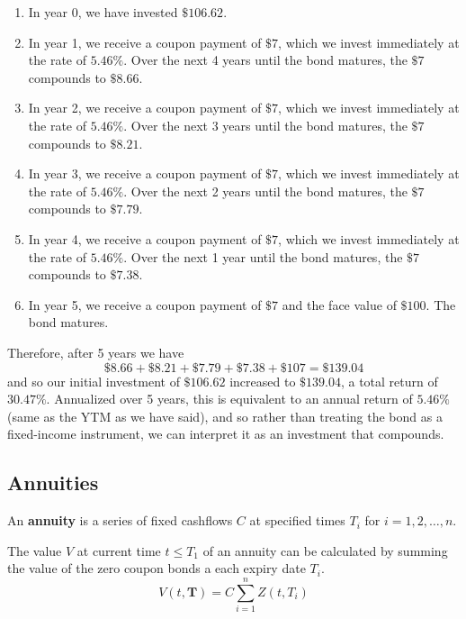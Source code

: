 \documentclass{article}
\begin{document}
    \begin{enumerate}
      \item In year 0, we have invested $\$106.62$.
      \item In year 1, we receive a coupon payment of $\$7$, which we invest immediately at the rate of $5.46\%$. Over the next 4 years until the bond matures, the $\$7$ compounds to $\$8.66$.
      \item In year 2, we receive a coupon payment of $\$7$, which we invest immediately at the rate of $5.46\%$. Over the next 3 years until the bond matures, the $\$7$ compounds to $\$8.21$.
      \item In year 3, we receive a coupon payment of $\$7$, which we invest immediately at the rate of $5.46\%$. Over the next 2 years until the bond matures, the $\$7$ compounds to $\$7.79$.
      \item In year 4, we receive a coupon payment of $\$7$, which we invest immediately at the rate of $5.46\%$. Over the next 1 year until the bond matures, the $\$7$ compounds to $\$7.38$.
      \item In year 5, we receive a coupon payment of $\$7$ and the face value of $\$100$. The bond matures.
    \end{enumerate}

    Therefore, after 5 years we have
    \begin{equation}
      \$8.66+\$8.21 + \$7.79 + \$7.38 + \$107 = \$139.04
    \end{equation}
    and so our initial investment of $\$106.62$ increased to $\$139.04$, a total return of $30.47\%$. Annualized over 5 years, this is equivalent to an annual return of $5.46\%$ (same as the YTM as we have said), and so rather than treating the bond as a fixed-income instrument, we can interpret it as an investment that compounds.

  \subsection{Annuities}

    \begin{definition}[Annuity]
      \label{def:annuity}
      An \textbf{annuity} is a series of fixed cashflows $C$ at specified times $T_i$ for $i = 1, 2, \ldots, n$. 
    \end{definition}

    \begin{theorem}
      \label{thm:value-of-annuity}
      The value $V$ at current time $t \leq T_1$ of an annuity can be calculated by summing the value of the zero coupon bonds a each expiry date $T_i$. 
      \begin{equation}
        V(t, \mathbf{T}) = C \sum_{i=1}^n Z(t, T_i)
      \end{equation}
    \end{theorem}
\end{document}
